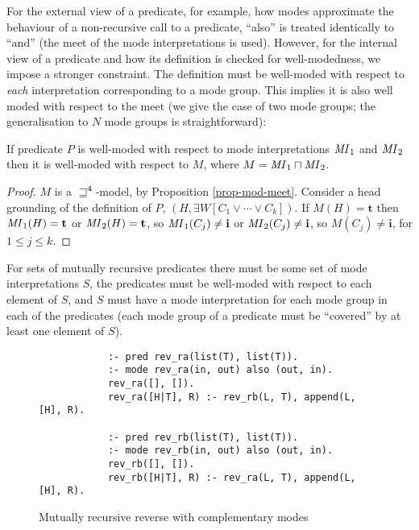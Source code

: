 \documentclass{tlp}
\newcommand{\Quad}{\ensuremath{\mathbf{4}}}
\newcommand{\ident}[1]{\mbox{\textit{#1}}}
\begin{document}
\noindent
For the external view of a predicate, for example, how modes approximate
the behaviour of a non-recursive call to a predicate, ``also'' is
treated identically to ``and'' (the meet of the mode interpretations is
used).  However, for the internal view of a predicate and how its
definition is checked for well-modedness, we impose a
stronger constraint.  The definition must be well-moded
with respect to \emph{each} interpretation corresponding to a mode group.
This implies it is also well moded with respect to the meet (we give the
case of two mode groups; the generalisation to $N$ mode groups is
straightforward):

\begin{proposition}
\label{prop-meet-well-moded}
If predicate $P$ is well-moded with respect to mode interpretations
$\ident{MI}_1$ and $\ident{MI}_2$ then it is well-moded with respect to
$M$, where $M = \ident{MI}_1 \sqcap \ident{MI}_2$.
\end{proposition}
\begin{proof}
$M$ is a $\sqsupseteq^\Quad$-model, by Proposition \ref{prop-mod-meet}.
Consider a head grounding of the definition of $P$, 
$(H,\exists W[C_1 \lor \cdots \lor C_k])$.
If $M(H) = \mathbf{t}$ then $\ident{MI}_1(H) = \mathbf{t}$ or
$\ident{MI}_2(H) = \mathbf{t}$, so
$\ident{MI}_1(C_j) \neq \mathbf{i}$ or
$\ident{MI}_2(C_j) \neq \mathbf{i}$, so
$M(C_j) \neq \mathbf{i}$, for $1 \leq j \leq k$.
\end{proof}
For sets of mutually recursive predicates there must be some set of mode
interpretations $S$, the predicates must be well-moded with respect to
each element of $S$, and $S$ must have a mode interpretation for each
mode group in each of the predicates (each mode group of a predicate
must be ``covered'' by at least one element of $S$).

\begin{figure}
\begin{verbatim}
            :- pred rev_ra(list(T), list(T)).
            :- mode rev_ra(in, out) also (out, in).
            rev_ra([], []).
            rev_ra([H|T], R) :- rev_rb(L, T), append(L, [H], R).

            :- pred rev_rb(list(T), list(T)).
            :- mode rev_rb(in, out) also (out, in).
            rev_rb([], []).
            rev_rb([H|T], R) :- rev_ra(L, T), append(L, [H], R).
\end{verbatim}
\caption{Mutually recursive reverse with complementary modes\label{fig-rrev}}
\end{figure}
\end{document}

